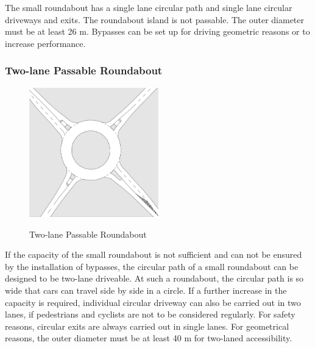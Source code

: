 The small roundabout has a single lane circular path and single lane circular driveways and exits. The roundabout island is not passable.
The outer diameter must be at least 26 m. Bypasses can be set up for driving geometric reasons or to increase performance.


\subsubsection{Two-lane Passable Roundabout}

\begin{figure}[!ht]
\caption{Two-lane Passable Roundabout \cite{man06}}
\includegraphics[width=0.5\textwidth]{bilder/twolaned_roundabout.png} %
\label{roundabout_twolaned}
\end{figure}

%
If the capacity of the small roundabout is not sufficient and can not be ensured by the installation of bypasses,
the circular path of a small roundabout can be designed to be two-lane driveable.
At such a roundabout, the circular path is so wide that cars can travel side by side in a circle.
If a further increase in the capacity is required, individual circular driveway can also be carried out in two lanes, if pedestrians and cyclists are not to be considered regularly.
For safety reasons, circular exits are always carried out in single lanes.
For geometrical reasons, the outer diameter must be at least 40 m for two-laned accessibility.


